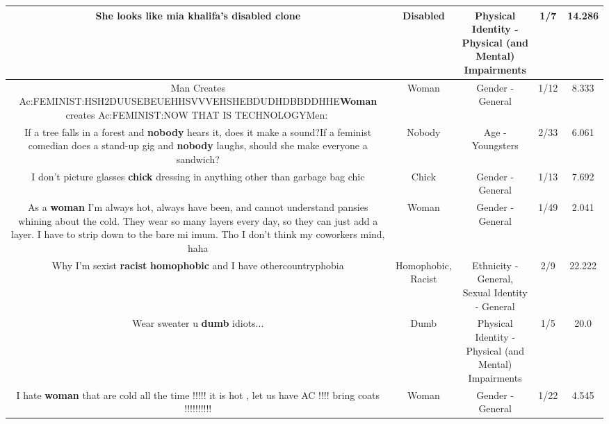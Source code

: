\documentclass[11pt]{article}
\newlength\mylength
\begin{document}
\begin{center}
\begin{longtable}{|C{.65\mylength}|C{.30\mylength}|C{.12\mylength}|C{.12\mylength}|C{.12\mylength}|}
  \small She looks like mia khalifa's \textbf{disabled} clone\normalsize   & Disabled & Physical Identity - Physical (and Mental) Impairments & 1/7 & 14.286 \\  \hline
  \small Man Creates Ac:FEMINIST:HSH2DUUSEBEUEHHSVVVEHSHEBDUDHDBBDDHHE\textbf{Woman} creates Ac:FEMINIST:NOW THAT IS TECHNOLOGYMen:🤨\normalsize   & Woman & Gender - General & 1/12 & 8.333 \\  \hline
  \small If a tree falls in a forest and \textbf{nobody} hears it, does it make a sound?If a feminist comedian does a stand-up gig and \textbf{nobody} laughs, should she make everyone a sandwich?\normalsize   & Nobody & Age - Youngsters & 2/33 & 6.061 \\  \hline
  \small I don't picture glasses \textbf{chick} dressing in anything other than garbage bag chic\normalsize   & Chick & Gender - General & 1/13 & 7.692 \\  \hline
  \small As a \textbf{woman} I'm always hot, always have been, and cannot understand pansies whining about the cold. They wear so many layers every day, so they can just add a layer. I have to strip down to the bare mi imum. Tho I don't think my coworkers mind, haha\normalsize   & Woman & Gender - General & 1/49 & 2.041 \\  \hline
  \small Why I'm sexist \textbf{racist} \textbf{homophobic} and I have othercountryphobia\normalsize   & Homophobic, Racist & Ethnicity - General, Sexual Identity - General & 2/9 & 22.222 \\  \hline
  \small Wear sweater u \textbf{dumb} idiots...\normalsize   & Dumb & Physical Identity - Physical (and Mental) Impairments & 1/5 & 20.0 \\  \hline
  \small I hate \textbf{woman} that are cold all the time !!!!! it is hot , let us have AC !!!! bring coats !!!!!!!!!!\normalsize   & Woman & Gender - General & 1/22 & 4.545 \\  \hline

\end{longtable}
\end{center}
\end{document}
